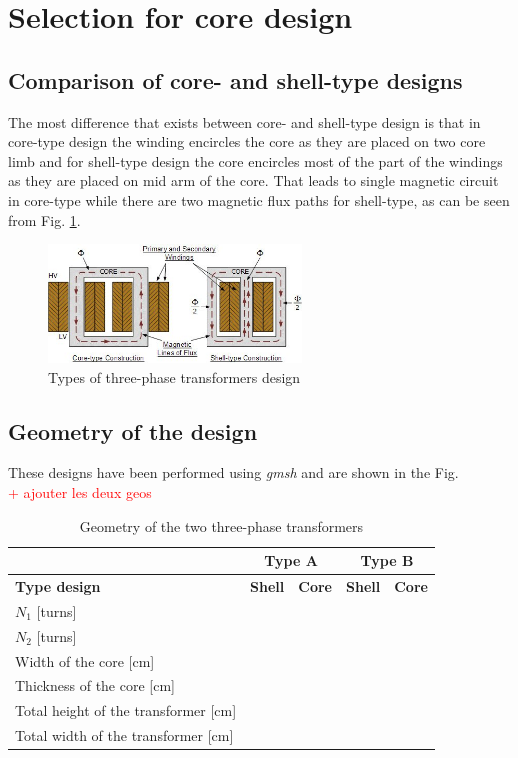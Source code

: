 \documentclass[12pt,a4paper]{report}
\begin{document}
\section{Selection for core design}
\subsection{Comparison of core- and shell-type designs}
The most difference that exists between core- and shell-type design is that in core-type design the winding encircles the core as they are placed on two core limb and for shell-type design the core encircles most of the part of the windings as they are placed on mid arm of the core. That leads to single magnetic circuit in core-type while there are two magnetic flux paths for shell-type, as can be seen from Fig. \ref{fig:shell_core_type}.

 \begin{figure}[h]
    \centering
    \includegraphics[width=0.6\textwidth]{type_design_2.jpg}
    \caption{Types of three-phase transformers design}
    \label{fig:shell_core_type}
\end{figure}


\subsection{Geometry of the design}
These designs have been performed using \textit{gmsh} and are shown in the Fig.\\
\textcolor{red}{+ ajouter les deux geos}

\begin{table}[h]
    \centering
\begin{tabular}{|l|l|l|l|l|}
  \hline
   & \multicolumn{2}{c|}{\textbf{Type A}} & \multicolumn{2}{c|}{\textbf{Type B}}\\\hline
   \textbf{Type design} & \textbf{Shell} & \textbf{Core} & \textbf{Shell} & \textbf{Core}\\\hline
   $N_1$ [turns]& & & &\\\hline
    $N_2$ [turns]& & & &\\\hline
    Width of the core [cm]& & & &\\\hline
    Thickness of the core [cm]& & & &\\\hline
    Total height of the transformer [cm]& & & &\\\hline
    Total width of the transformer [cm]& & & &\\
  \hline
\end{tabular}
    \caption{Geometry of the two three-phase transformers}
    \label{tab:designed_transfo}
\end{table}
\end{document}
